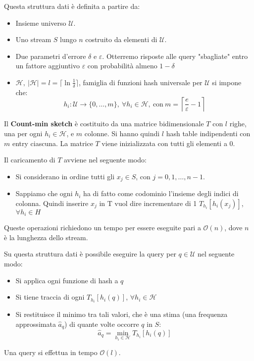 Questa struttura dati è definita a partire da:
\begin{itemize}
    \item Insieme universo $\mathcal{U}$.
    \item Uno stream $S$ lungo $n$ costruito da elementi di $\mathcal{U}$.
    \item Due parametri d'errore $\delta$ e $\varepsilon$. Otterremo risposte
          alle query "sbagliate" entro un fattore aggiuntivo $\varepsilon$ con
          probabilità almeno $1 - \delta$
    \item $\mathcal{H}, \ |\mathcal{H}| = l = \lceil \ln \frac{1}{\delta} \rceil$,
          famiglia di funzioni hash universale per $\mathcal{U}$ si impone che:
          \begin{equation}
              h_i: \mathcal{U} \to \{0, \dots, m\}, \ \forall h_i \in \mathcal{H},
              \ \text{con} \ m = \left\lceil \frac{e}{\varepsilon} - 1 \right\rceil
          \end{equation}
\end{itemize}
Il \textbf{Count-min sketch} è costituito da una matrice bidimensionale $T$ con
$l$ righe, una per ogni $h_i \in \mathcal{H}$, e $m$ colonne. Si hanno quindi $l$
hash table indipendenti con $m$ entry ciascuna. La matrice $T$ viene inizializzata
con tutti gli elementi a $0$.

Il caricamento di $T$ avviene nel seguente modo:
\begin{itemize}
    \item Si considerano in ordine tutti gli $x_j \in S$, con $j = 0, 1, \dots,
              n - 1$.
    \item Sappiamo che ogni $h_i$ ha di fatto come codominio l'insieme degli indici
          di colonna. Quindi inserire $x_j$ in T vuol dire incrementare di 1
          $T_{h_i} [h_i(x_j)]$, $\forall h_i \in H$
\end{itemize}
Queste operazioni richiedono un tempo per essere eseguite pari a $\mathcal{O}(n)$,
dove $n$ è la lunghezza dello stream.

Su questa struttura dati è possibile eseguire la query per $q \in \mathcal{U}$
nel seguente modo:
\begin{itemize}
    \item Si applica ogni funzione di hash a $q$
    \item Si tiene traccia di ogni $T_{h_i} [h_i(q)]$, $\forall h_i \in \mathcal{H}$
    \item Si restituisce il minimo tra tali valori, che è una stima (una frequenza
          approssimata $\hat{a}_q$) di quante volte occorre $q$ in $S$:
          \begin{equation}
              \hat{a}_q = \min_{h_i \in \mathcal{H}} T_{h_i} [h_i(q)]
          \end{equation}
\end{itemize}
Una query si effettua in tempo $\mathcal{O}(l)$.

